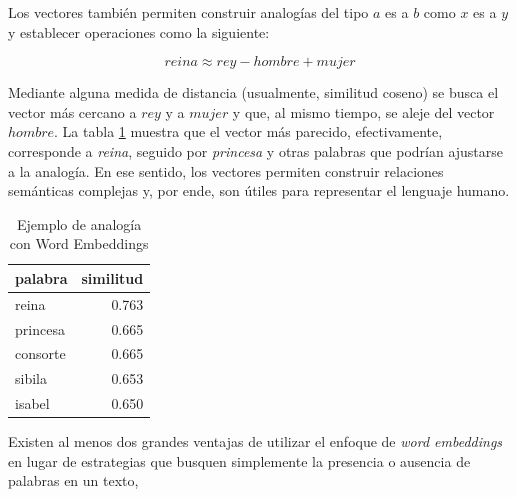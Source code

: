 \documentclass[
  12pt,
]{article}
\begin{document}
Los vectores también permiten construir analogías del tipo \(a\) es a
\(b\) como \(x\) es a \(y\) y establecer operaciones como la siguiente:

\[reina \approx rey - hombre + mujer\]

Mediante alguna medida de distancia (usualmente, similitud coseno) se
busca el vector más cercano a \(rey\) y a \(mujer\) y que, al mismo
tiempo, se aleje del vector \(hombre\). La tabla
\ref{tab:ejemplo_analogia} muestra que el vector más parecido,
efectivamente, corresponde a \emph{reina}, seguido por \emph{princesa} y
otras palabras que podrían ajustarse a la analogía. En ese sentido, los
vectores permiten construir relaciones semánticas complejas y, por ende,
son útiles para representar el lenguaje humano.

\begin{table}[H]

\caption{\label{tab:ejemplo_analogia}Ejemplo de analogía con Word Embeddings}
\centering
\begin{tabular}[t]{lr}
\toprule
palabra & similitud\\
\midrule
reina & 0.763\\
princesa & 0.665\\
consorte & 0.665\\
sibila & 0.653\\
isabel & 0.650\\
\bottomrule
\end{tabular}
\end{table}

Existen al menos dos grandes ventajas de utilizar el enfoque de
\emph{word embeddings} en lugar de estrategias que busquen simplemente
la presencia o ausencia de palabras en un texto,
\end{document}
